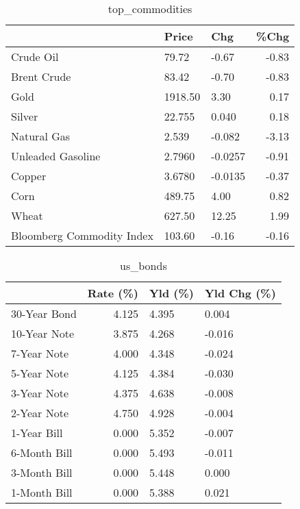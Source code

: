 \documentclass{article}%
\begin{document}
\begin{table}[htbp]%
\caption{top\_commodities}%
\centering%
\begin{adjustbox}{width=1\textwidth}%
\begin{tabular}{lllr}
\toprule
                          &   Price &     Chg &  \%Chg \\
\midrule
               Crude Oil  &   79.72 &   -0.67 & -0.83 \\
             Brent Crude  &   83.42 &   -0.70 & -0.83 \\
                    Gold  & 1918.50 &    3.30 &  0.17 \\
                  Silver  &  22.755 &   0.040 &  0.18 \\
             Natural Gas  &   2.539 &  -0.082 & -3.13 \\
       Unleaded Gasoline  &  2.7960 & -0.0257 & -0.91 \\
                  Copper  &  3.6780 & -0.0135 & -0.37 \\
                    Corn  &  489.75 &    4.00 &  0.82 \\
                   Wheat  &  627.50 &   12.25 &  1.99 \\
Bloomberg Commodity Index &  103.60 &   -0.16 & -0.16 \\
\bottomrule
\end{tabular}
%
\end{adjustbox}%
\end{table}

%


\begin{table}[htbp]%
\caption{us\_bonds}%
\centering%
\begin{adjustbox}{width=1\textwidth}%
\begin{tabular}{lrll}
\toprule
             &  Rate (\%) & Yld (\%) & Yld Chg (\%) \\
\midrule
30-Year Bond &     4.125 &   4.395 &       0.004 \\
10-Year Note &     3.875 &   4.268 &      -0.016 \\
 7-Year Note &     4.000 &   4.348 &      -0.024 \\
 5-Year Note &     4.125 &   4.384 &      -0.030 \\
 3-Year Note &     4.375 &   4.638 &      -0.008 \\
 2-Year Note &     4.750 &   4.928 &      -0.004 \\
 1-Year Bill &     0.000 &   5.352 &      -0.007 \\
6-Month Bill &     0.000 &   5.493 &      -0.011 \\
3-Month Bill &     0.000 &   5.448 &       0.000 \\
1-Month Bill &     0.000 &   5.388 &       0.021 \\
\bottomrule
\end{tabular}
%
\end{adjustbox}%
\end{table}
\end{document}
